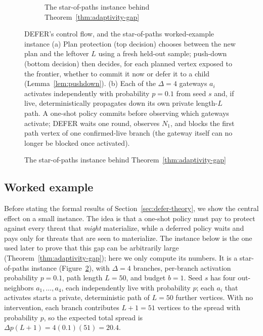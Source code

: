 \documentclass[ijoc,sglanonrev]{informs4}
\begin{document}
\begin{figure}[h]
{\begin{subfigure}[t]{0.64\textwidth}
{}
\caption{The star-of-paths instance behind Theorem~\ref{thm:adaptivity-gap}}
\label{fig:star-of-paths}
\end{subfigure}
}
{DEFER's control flow, and the star-of-paths worked-example instance}
{(a) Plan protection (top decision) chooses between the new plan and the
leftover $L$ using a fresh held-out sample; push-down (bottom decision)
then decides, for each planned vertex exposed to the frontier, whether to
commit it now or defer it to a child (Lemma~\ref{lem:pushdown}). (b) Each
of the $\Delta=4$ gateways $a_i$ activates independently with probability
$p=0.1$ from seed $s$ and, if live, deterministically propagates down its
own private length-$L$ path. A one-shot policy commits before observing
which gateways activate; DEFER waits one round, observes $N_1$, and
blocks the first path vertex of one confirmed-live branch (the gateway
itself can no longer be blocked once activated).}
\end{figure}

\subsection{Worked example}\label{sec:defer-example}

Before stating the formal results of Section~\ref{sec:defer-theory}, we show
the central effect on a small instance. The idea is that a one-shot policy
must pay to protect against every threat that \emph{might} materialize,
while a deferred policy waits and pays only for threats that are seen to
materialize. The instance below is the one used later to prove that this gap
can be arbitrarily large (Theorem~\ref{thm:adaptivity-gap}); here we only
compute its numbers. It is a star-of-paths instance
(Figure~\ref{fig:star-of-paths}), with $\Delta=4$ branches,
per-branch activation probability $p=0.1$, path length $L=50$, and budget
$b=1$. Seed $s$ has four out-neighbors $a_1,\dots,a_4$, each independently
live with probability $p$; each $a_i$ that activates starts a private,
deterministic path of $L=50$ further vertices. With no intervention, each
branch contributes $L+1=51$ vertices to the spread with probability $p$,
so the expected total spread is $\Delta p(L+1)=4(0.1)(51)=20.4$.
\end{document}
